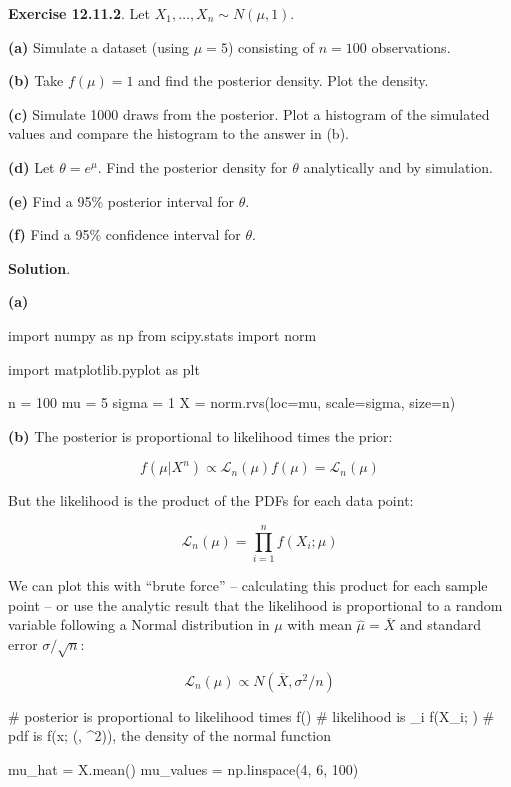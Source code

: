\textbf{Exercise 12.11.2}. Let \(X_1, \dots, X_n \sim N(\mu, 1)\).

\textbf{(a)} Simulate a dataset (using \(\mu = 5\)) consisting of
\(n = 100\) observations.

\textbf{(b)} Take \(f(\mu) = 1\) and find the posterior density. Plot
the density.

\textbf{(c)} Simulate 1000 draws from the posterior. Plot a histogram of
the simulated values and compare the histogram to the answer in (b).

\textbf{(d)} Let \(\theta = e^\mu\). Find the posterior density for
\(\theta\) analytically and by simulation.

\textbf{(e)} Find a 95\% posterior interval for \(\theta\).

\textbf{(f)} Find a 95\% confidence interval for \(\theta\).

\textbf{Solution}.

\textbf{(a)}

\begin{python}
import numpy as np
from scipy.stats import norm

import matplotlib.pyplot as plt

n = 100
mu = 5
sigma = 1
X = norm.rvs(loc=mu, scale=sigma, size=n)
\end{python}

\textbf{(b)} The posterior is proportional to likelihood times the
prior:

\[f(\mu | X^n) \propto \mathcal{L}_n(\mu) f(\mu) = \mathcal{L}_n(\mu)\]

But the likelihood is the product of the PDFs for each data point:

\[\mathcal{L}_n(\mu) = \prod_{i=1}^n f(X_i; \mu)\]

We can plot this with ``brute force'' -- calculating this product for
each sample point -- or use the analytic result that the likelihood is
proportional to a random variable following a Normal distribution in
\(\mu\) with mean \(\hat{\mu} = \overline{X}\) and standard error
\(\sigma / \sqrt{n}\):

\[\mathcal{L}_n(\mu) \propto N(\overline{X}, \sigma^2 / n)\]

\begin{python}
# posterior is proportional to likelihood times f(\mu)
# likelihood is \prod_i f(X_i; \mu)
# pdf is f(x; (\mu, \sigma^2)), the density of the normal function

mu_hat = X.mean()
mu_values = np.linspace(4, 6, 100)
\end{python}

